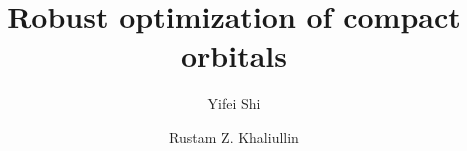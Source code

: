 \documentclass[aps,prl,twocolumn,reprint,amsmath,amssymb]{revtex4-1}
\begin{document}
\newcommand{\Ang}{\ensuremath{\mathring{\text{A}}}}
\newcommand{\ltwid}{\mathrel{\raise.3ex\hbox{$<$\kern-.75em\lower1ex\hbox{$\sim$}}}}
\newcommand{\gtwid}{\mathrel{\raise.3ex\hbox{$>$\kern-.75em\lower1ex\hbox{$\sim$}}}}
\newcommand{\ket}[1]{\ensuremath{\vert #1 \rangle}}
\newcommand{\bra}[1]{\ensuremath{\langle #1 \vert}}
\newcommand{\braket}[2]{\ensuremath{\langle #1 \vert #2 \rangle}} %
\newcommand{\ketbra}[2]{\ensuremath{\vert #1 \rangle \langle #2 \vert}} %
\newcommand{\op}[1]{\ensuremath{\hat{#1}}} %
\newcommand{\sill}{\psi}
\newcommand{\trace}{{\rm Tr}}
\newcommand{\ntilde}{\tilde{n}}
\newcommand{\stilde}{\tilde{s}}
\newcommand{\atilde}{\tilde{\alpha}}
\newcommand{\new}{\color{red}}
\newcommand{\old}{\color{black}}
\newcommand{\bea}{\begin{eqnarray}}
\newcommand{\eea}{\end{eqnarray}}
\newcommand{\br}{\ensuremath{\mathbf{r}}}
\def\nn{\nonumber\\}



\title{Robust optimization of compact orbitals}

\author{Yifei Shi}
\author{Rustam Z. Khaliullin}

\end{document}
